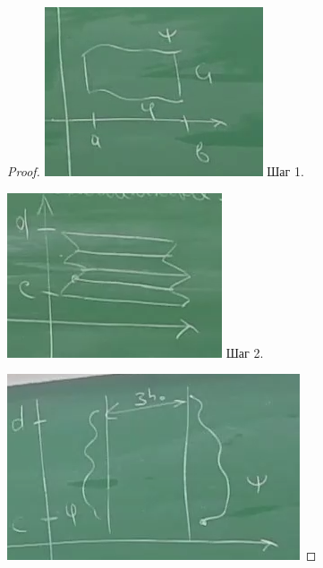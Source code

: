 \begin{proof}
\noindent 
\begin{minipage}{0.3\textwidth}
\includegraphics[width=\textwidth]{images/Grin_step1.png}
Шаг 1.
\end{minipage}
\begin{minipage}{0.3\textwidth}
\includegraphics[width=\textwidth]{images/Grin_step2.png}
Шаг 2.
\end{minipage}
\begin{minipage}{0.365\textwidth}
\includegraphics[width=\textwidth]{images/Grin_step3.png}

\end{minipage}
\end{proof}
